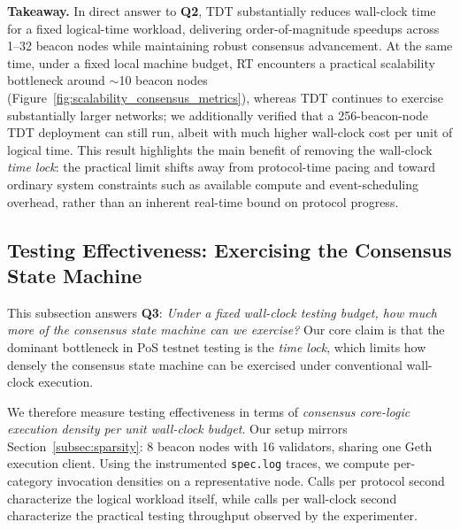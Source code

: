 \smallskip
\noindent\textbf{Takeaway.}
In direct answer to \textbf{Q2}, TDT substantially reduces wall-clock time for a fixed logical-time workload, delivering order-of-magnitude speedups across 1--32 beacon nodes while maintaining robust consensus advancement. At the same time, under a fixed local machine budget, RT encounters a practical scalability bottleneck around $\sim$10 beacon nodes (Figure~\ref{fig:scalability_consensus_metrics}), whereas TDT continues to exercise substantially larger networks; we additionally verified that a 256-beacon-node TDT deployment can still run, albeit with much higher wall-clock cost per unit of logical time. This result highlights the main benefit of removing the wall-clock \emph{time lock}: the practical limit shifts away from protocol-time pacing and toward ordinary system constraints such as available compute and event-scheduling overhead, rather than an inherent real-time bound on protocol progress.


\subsection{Testing Effectiveness: Exercising the Consensus State Machine}
\label{subsec:eval_effectiveness}

This subsection answers \textbf{Q3}: \emph{Under a fixed wall-clock testing budget, how much more of the consensus state machine can we exercise?} Our core claim is that the dominant bottleneck in PoS testnet testing is the \emph{time lock}, which limits how densely the consensus state machine can be exercised under conventional wall-clock execution.

We therefore measure testing effectiveness in terms of \emph{consensus core-logic execution density per unit wall-clock budget}. Our setup mirrors Section~\ref{subsec:sparsity}: 8 beacon nodes with 16 validators, sharing one Geth execution client. Using the instrumented \texttt{spec.log} traces, we compute per-category invocation densities on a representative node. Calls per protocol second characterize the logical workload itself, while calls per wall-clock second characterize the practical testing throughput observed by the experimenter.


